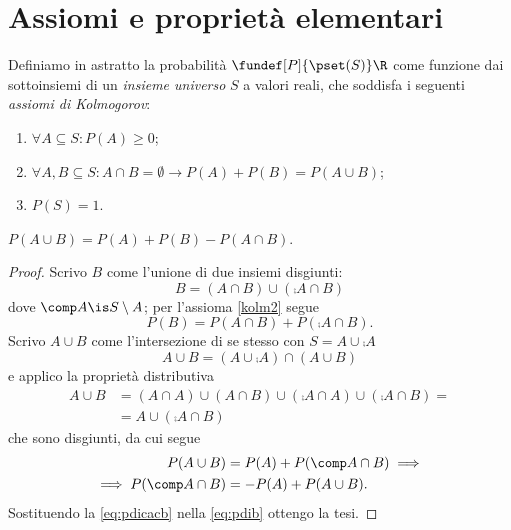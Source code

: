 
\section{Assiomi e proprietà elementari}

\begin{definition}[Probabilità]
	Definiamo in astratto la probabilità $\fundef[P]{\pset(S)}\R$ come funzione dai sottoinsiemi di un \emph{insieme universo} $S$ a valori reali, che soddisfa i seguenti \emph{assiomi di Kolmogorov}:
	\begin{enumerate}
		\item $\forall A\subseteq S:P(A) \ge 0$;
		\item $\forall A,B\subseteq S: A\cap B=\emptyset \rightarrow P(A)+P(B)=P(A\cup B)$; \label{kolm2}
		\item $P(S)=1$.
	\end{enumerate}
\end{definition}

\begin{theorem}
	$P(A\cup B) = P(A) + P(B) - P(A\cap B)$.
\end{theorem}

\begin{proof}
	Scrivo $B$ come l'unione di due insiemi disgiunti:
	\[B = (A\cap B) \cup (\comp A \cap B)\]
	dove $\comp A\is S\setminus A$; per l'assioma \ref{kolm2} segue
	\begin{equation}
		\label{eq:pdib}
		P(B) = P(A\cap B) + P(\comp A \cap B).
	\end{equation}
	Scrivo $A\cup B$ come l'intersezione di se stesso con $S=A\cup\comp A$
	\[A\cup B = (A\cup\comp A) \cap (A\cup B)\]
	e applico la proprietà distributiva
	\begin{align*}
		A\cup B
		&= (A\cap A) \cup (A\cap B) \cup (\comp A\cap A) \cup (\comp A \cap B) = \\
		&= A \cup (\comp A\cap B)
	\end{align*}
	che sono disgiunti, da cui segue
	\begin{align}
		P(A\cup B)
		&= P(A) + P(\comp A\cap B) \implies \notag \\
		\implies P(\comp A\cap B)
		&= -P(A) + P(A\cup B). \label{eq:pdicacb}
	\end{align}
	Sostituendo la \eqref{eq:pdicacb} nella \eqref{eq:pdib} ottengo la tesi.
\end{proof}

